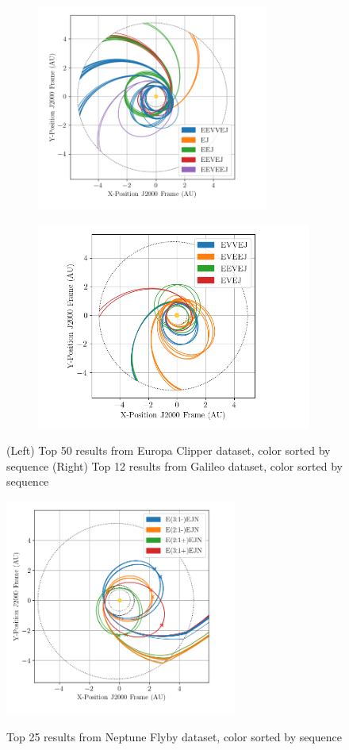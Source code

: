 \documentclass[letterpaper, preprint, paper,11pt]{AAS}	%
\begin{document}
\begin{figure}[h!]
    \begin{subfigure}{}
        \includegraphics[width=3in]{./fig/clipperFamilies.png}
        \label{fig:clipFam}
    \end{subfigure}
    \begin{subfigure}{}
        \includegraphics[width=3.55in]{./fig/galileoFamilies.png}
        \label{fig:galiFam}
    \end{subfigure}
    \caption{(Left) Top 50 results from Europa Clipper dataset, color sorted by sequence (Right) Top 12 results from Galileo dataset, color sorted by sequence}
\end{figure}
\begin{figure}[h]
    \centering
    \includegraphics[width=3in]{./fig/tridentFamilies.png}
    \label{fig:tridFam}
    \caption{Top 25 results from Neptune Flyby dataset, color sorted by sequence}
\end{figure}


\clearpage
{}
\end{document}
